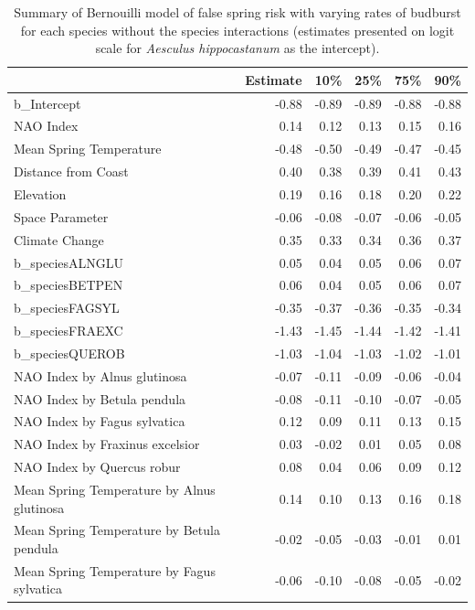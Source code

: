 \documentclass{article}\usepackage[]{graphicx}\usepackage[]{color}
\begin{document}
{%
\begin{table}[H]
\centering
\caption{Summary of Bernouilli model of false spring risk with varying rates of budburst for each species without the species interactions (estimates presented on logit scale for \textit{Aesculus hippocastanum} as the intercept).} 
\begin{tabular}{lrrrrr}
  \hline
 & Estimate & 10\% & 25\% & 75\% & 90\% \\ 
  \hline
b_Intercept & -0.88 & -0.89 & -0.89 & -0.88 & -0.88 \\ 
  NAO Index & 0.14 & 0.12 & 0.13 & 0.15 & 0.16 \\ 
  Mean Spring 
Temperature & -0.48 & -0.50 & -0.49 & -0.47 & -0.45 \\ 
  Distance from 
Coast & 0.40 & 0.38 & 0.39 & 0.41 & 0.43 \\ 
  Elevation & 0.19 & 0.16 & 0.18 & 0.20 & 0.22 \\ 
  Space Parameter & -0.06 & -0.08 & -0.07 & -0.06 & -0.05 \\ 
  Climate Change & 0.35 & 0.33 & 0.34 & 0.36 & 0.37 \\ 
  b_speciesALNGLU & 0.05 & 0.04 & 0.05 & 0.06 & 0.07 \\ 
  b_speciesBETPEN & 0.06 & 0.04 & 0.05 & 0.06 & 0.07 \\ 
  b_speciesFAGSYL & -0.35 & -0.37 & -0.36 & -0.35 & -0.34 \\ 
  b_speciesFRAEXC & -1.43 & -1.45 & -1.44 & -1.42 & -1.41 \\ 
  b_speciesQUEROB & -1.03 & -1.04 & -1.03 & -1.02 & -1.01 \\ 
  NAO Index by Alnus glutinosa & -0.07 & -0.11 & -0.09 & -0.06 & -0.04 \\ 
  NAO Index by Betula pendula & -0.08 & -0.11 & -0.10 & -0.07 & -0.05 \\ 
  NAO Index by Fagus sylvatica & 0.12 & 0.09 & 0.11 & 0.13 & 0.15 \\ 
  NAO Index by Fraxinus excelsior & 0.03 & -0.02 & 0.01 & 0.05 & 0.08 \\ 
  NAO Index by Quercus robur & 0.08 & 0.04 & 0.06 & 0.09 & 0.12 \\ 
  Mean Spring 
Temperature by Alnus glutinosa & 0.14 & 0.10 & 0.13 & 0.16 & 0.18 \\ 
  Mean Spring 
Temperature by Betula pendula & -0.02 & -0.05 & -0.03 & -0.01 & 0.01 \\ 
  Mean Spring 
Temperature by Fagus sylvatica & -0.06 & -0.10 & -0.08 & -0.05 & -0.02 \\ 

\end{tabular}
\end{table}}
\end{document}
